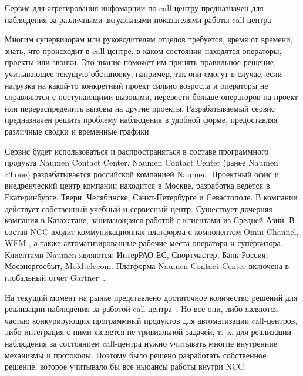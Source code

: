 \Introduction

Сервис для агрегирования инфомарции по call-центру предназначен для наблюдения за различными актуальными
показателями работы call-центра.

Многим супервизорам или руководителям отделов требуется, время от времени, знать,
что происходит в call-центре, в каком состоянии находятся операторы, проекты или звонки.
Это знание поможет им принять правильное решение, учитывающее текущую обстановку, например,
так они смогут в случае, если нагрузка на какой-то конкретный проект сильно возросла
и операторы не справляются с поступающими вызовами,
перевести больше операторов на проект или перераспределить вызовы на другие проекты.
Разрабатываемый сервис предназначен решить проблему наблюдения в удобной форме,
предоставляя различные сводки и временные графики.

Сервис будет использоваться и распространяться в составе программного продукта Naumen Contact Center.
Naumen Contact Center (ранее Naumen Phone) разрабатывается российской компанией Naumen.
Проектный офис и внедренческий центр компании находится в Москве, разработка ведётся в Екатеринбурге, Твери, Челябинске,
Санкт-Петербурге и Севастополе.
В компании действует собственный учебный и сервисный центр.
Существует дочерняя компания в Казахстане, занимающаяся работой с клиентами из Средней Азии.
В состав NCC входит коммуникационная платформа с компонентом Omni-Channel, WFM
,
а также автоматизированные рабочие места оператора и супервизора.
Клиентами Naumen являются:
ИнтерРАО
ЕС,
Спортмастер,
Банк
Россия,
Мосэнергосбыт,
Moldtelecom.
Платформа Naumen Contact Center включена в глобальный отчет Gartner~\cite{doc:intro}.

На текущий момент на рынке представлено достаточное количество решений для реализации наблюдения за работой call-центра~\cite{other:rival}.
Но все они, либо являются частью конкурирующих программный продуктов для автоматизации call-центров,
либо интеграция с ними является не тривиальной задачей,
т.~к. для реализации наблюдения за состоянием call-центра нужно учитывать многие внутренние механизмы и протоколы.
Поэтому было решено разработать собственное решение, которое учитывало бы все ньюансы работы внутри NCC\@.

